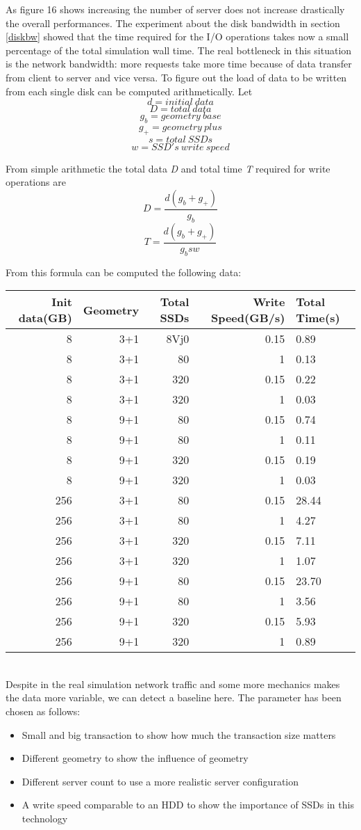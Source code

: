 As figure 16 shows increasing the number of server does not increase drastically
the overall performances. The experiment about the disk bandwidth in section
\ref{diskbw} showed that the time required for the I/O operations takes now a
small percentage of the total simulation wall time. The real bottleneck in this
situation is the network bandwidth: more requests take more time because of data
transfer from client to server and vice versa. To figure out the load of data to
be written from each single disk can be computed arithmetically.
Let 
$$ d = initial\ data $$
$$ D = total\ data $$
$$ g_b = geometry\ base $$
$$ g_+ = geometry\ plus $$
$$ s = total\ SSDs $$
$$ w = SSD's\ write\ speed $$

From simple arithmetic the total data \emph{D} and total time \emph{T} required
for write operations are
$$ D = \frac{d (g_b + g_+)}{g_b}$$
$$ T = \frac{d(g_b + g_+)}{g_bsw} $$ 

From this formula can be computed the following data:

\begin{tabular}{r | r | r| r| l}
    Init data(GB) & Geometry & Total SSDs & Write Speed(GB/s)& Total Time(s)\\\hline
    8 & 3+1 & 8Vj0 & 0.15 & 0.89 \\
    8 & 3+1 & 80 & 1 & 0.13 \\
    8 & 3+1 & 320 & 0.15 & 0.22 \\
    8 & 3+1 & 320 & 1 & 0.03 \\
    8 & 9+1 & 80 & 0.15 & 0.74 \\
    8 & 9+1 & 80 & 1 & 0.11 \\
    8 & 9+1 & 320 & 0.15 & 0.19 \\
    8 & 9+1 & 320 & 1 & 0.03 \\
    256 & 3+1 & 80 & 0.15 & 28.44 \\
    256 & 3+1 & 80 & 1 & 4.27 \\
    256 & 3+1 & 320 & 0.15 & 7.11 \\
    256 & 3+1 & 320 & 1 & 1.07 \\
    256 & 9+1 & 80 & 0.15 & 23.70 \\
    256 & 9+1 & 80 & 1 & 3.56 \\
    256 & 9+1 & 320 & 0.15 & 5.93 \\
    256 & 9+1 & 320 & 1 & 0.89 \\
\end{tabular} \\

Despite in the real simulation network traffic and some more mechanics makes the
data more variable, we can detect a baseline here. The parameter has been chosen
as follows:
\begin{itemize}
    \item Small and big transaction to show how much the transaction size matters
    \item Different geometry to show the influence of geometry
    \item Different server count to use a more realistic server configuration
    \item A write speed comparable to an HDD to show the importance of SSDs in
        this technology
\end{itemize}

